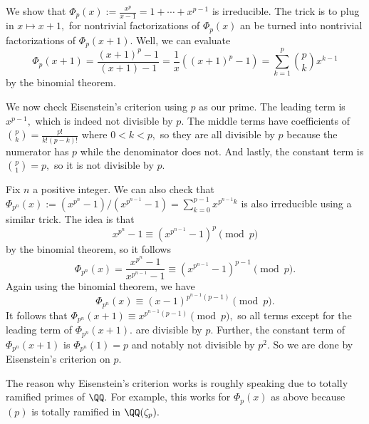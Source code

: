 \begin{example}
	We show that $\Phi_p(x):=\frac{x^p}{x-1}=1+\cdots+x^{p-1}$ is irreducible. The trick is to plug in $x\mapsto x+1,$ for nontrivial factorizations of $\Phi_p(x)$ an be turned into nontrivial factorizations of $\Phi_p(x+1).$ Well, we can evaluate
	\[\Phi_p(x+1)=\frac{(x+1)^p-1}{(x+1)-1}=\frac1x\left((x+1)^p-1\right)=\sum_{k=1}^p\binom pkx^{k-1}\]
	by the binomial theorem.
	
	We now check Eisenstein's criterion using $p$ as our prime. The leading term is $x^{p-1},$ which is indeed not divisible by $p.$ The middle terms have coefficients of $\binom pk=\frac{p!}{k!(p-k)!}$ where $0<k<p,$ so they are all divisible by $p$ because the numerator has $p$ while the denominator does not. And lastly, the constant term is $\binom p1=p,$ so it is not divisible by $p.$
\end{example}
\begin{example}
	Fix $n$ a positive integer. We can also check that $\Phi_{p^n}(x):=\left(x^{p^n}-1\right)/\left(x^{p^{n-1}}-1\right)=\sum_{k=0}^{p-1}x^{p^{n-1}k}$ is also irreducible using a similar trick. The idea is that
	\[x^{p^n}-1\equiv\left(x^{p^{n-1}}-1\right)^p\pmod p\]
	by the binomial theorem, so it follows
	\[\Phi_{p^n}(x)=\frac{x^{p^n}-1}{x^{p^{n-1}}-1}\equiv\left(x^{p^{n-1}}-1\right)^{p-1}\pmod p.\]
	Again using the binomial theorem, we have
	\[\Phi_{p^n}(x)\equiv(x-1)^{p^{n-1}(p-1)}\pmod p.\]
	It follows that $\Phi_{p^n}(x+1)\equiv x^{p^{n-1}(p-1)}\pmod p,$ so all terms except for the leading term of $\Phi_{p^n}(x+1).$ are divisible by $p.$ Further, the constant term of $\Phi_{p^n}(x+1)$ is $\Phi_{p^n}(1)=p$ and notably not divisible by $p^2.$ So we are done by Eisenstein's criterion on $p.$
\end{example}
\begin{remark}
	The reason why Eisenstein's criterion works is roughly speaking due to totally ramified primes of $\QQ.$ For example, this works for $\Phi_p(x)$ as above because $(p)$ is totally ramified in $\QQ(\zeta_p).$
\end{remark}

